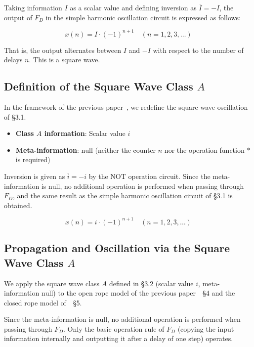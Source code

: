 \documentclass[12pt,a4paper]{article}
\begin{document}
Taking information $I$ as a scalar value and defining inversion as $\overline{I} = -I$, the
output of $F_D$ in the simple harmonic oscillation circuit is expressed as follows:

\begin{equation}
  x(n) = I \cdot (-1)^{n+1} \quad (n = 1, 2, 3, \ldots)
\end{equation}

That is, the output alternates between $I$ and $-I$ with respect to the number of delays $n$.
This is a square wave.

\subsection{Definition of the Square Wave Class $A$}

In the framework of the previous paper~\cite{ref2}, we redefine the square wave oscillation
of \S3.1.

\begin{itemize}
  \item \textbf{Class $A$ information}: Scalar value $i$
  \item \textbf{Meta-information}: $\mathrm{null}$ (neither the counter $n$ nor the operation
        function $*$ is required)
\end{itemize}

Inversion is given as $\overline{i} = -i$ by the NOT operation circuit. Since the
meta-information is $\mathrm{null}$, no additional operation is performed when passing through
$F_D$, and the same result as the simple harmonic oscillation circuit of \S3.1 is obtained.

\begin{equation}
  x(n) = i \cdot (-1)^{n+1} \quad (n = 1, 2, 3, \ldots)
\end{equation}

\subsection{Propagation and Oscillation via the Square Wave Class $A$}

We apply the square wave class $A$ defined in \S3.2 (scalar value $i$, meta-information
$\mathrm{null}$) to the open rope model of the previous paper~\cite{ref1}~\S4 and the closed
rope model of~\cite{ref1}~\S5.

Since the meta-information is $\mathrm{null}$, no additional operation is performed when
passing through $F_D$. Only the basic operation rule of $F_D$ (copying the input information
internally and outputting it after a delay of one step) operates.
\end{document}
